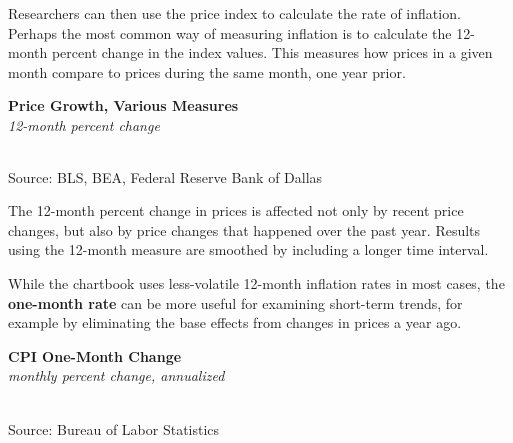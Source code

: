 \documentclass{report}
\newcommand{\tbllink}[1]{\href{https://raw.githubusercontent.com/bdecon/US-chartbook/master/chartbook/data/#1}{\faTable}}
\newcommand{\bbar}[2]{extra #1 ticks = {{#2}}, extra #1 tick labels = ,
		extra #1 tick style = {grid=major, grid style={thick, black!25}},}
\begin{document}
{{\begin{minipage}{0.76\textwidth}
Researchers can then use the price index to calculate the rate of inflation. Perhaps the most common way of measuring inflation is to calculate the 12-month percent change in the index values. This measures how prices in a given month compare to prices during the same month, one year prior. 
\vspace{1mm}

\normalsize \textbf{Price Growth, Various Measures}\\
\footnotesize{\textit{12-month percent change}}\\
\hspace*{-3mm}  \setlength{\tabcolsep}{3.1pt} \color{black!90}
	{\renewcommand{\arraystretch}{1.6}
		\begin{tabular}{p{31mm} R{8.0mm} R{8.0mm} R{8.0mm} R{8.0mm} R{8.0mm} R{8.0mm} 
		   R{9.5mm} R{9.5mm}}
			  \hline
		\end{tabular}}\vspace{-1mm}
		
\footnotesize{Source: BLS, BEA, Federal Reserve Bank of Dallas}
\vspace{2mm}

\small The 12-month percent change in prices is affected not only by recent price changes, but also by price changes that happened over the past year. Results using the 12-month measure are smoothed by including a longer time interval.

While the chartbook uses less-volatile 12-month inflation rates in most cases, the \textbf{one-month rate} can be more useful for examining short-term trends, for example by eliminating the base effects from changes in prices a year ago. 
\vspace{1mm}

\normalsize \textbf{CPI One-Month Change}\\
\footnotesize{\textit{monthly percent change, annualized}}\\
\hspace*{-3mm} \\
\footnotesize{Source: Bureau of Labor Statistics} \hfill \tbllink{cpi_monthly.csv}
\end{minipage}
\newpage
\hypertarget{prin}{}
\begin{minipage}{0.76\textwidth}

\end{minipage}}}
\end{document}
